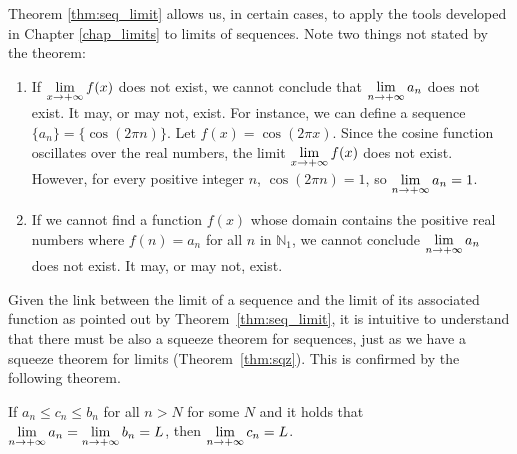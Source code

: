 Theorem \ref{thm:seq_limit} allows us, in certain cases, to apply the tools developed in Chapter \ref{chap_limits} to limits of sequences. Note two things not stated by the theorem:
	\begin{enumerate}
		\item If $\displaystyle \lim_{x\to+\infty}f(x)$ does not exist, we cannot conclude that $\displaystyle\lim_{n\to+\infty} a_n$ does not exist. It may, or may not, exist. For instance, we can define a sequence $\{a_n\} = \{\cos(2\pi n)\}$. Let $f(x) = \cos (2\pi x)$. Since the cosine function oscillates over the real numbers, the limit $\displaystyle \lim_{x\to+\infty}f(x)$ does not exist. However, for every positive integer $n$, $\cos(2\pi n) = 1$, so $\displaystyle \lim_{n\to+\infty} a_n = 1$.

		\item	If we cannot find a function $f(x)$ whose domain contains the positive real numbers where $f(n) = a_n$ for all $n$ in $\mathbb{N}_1$, we cannot conclude $\displaystyle\lim_{n\to+\infty} a_n$ does not exist. It may, or may not, exist.
	\end{enumerate}

\ifanalysis


Given the link between the limit of a sequence and the limit of its associated function as pointed out by Theorem~\ref{thm:seq_limit}, it is intuitive to understand that there must be also a squeeze theorem for sequences, just as we have a squeeze theorem for limits (Theorem~\ref{thm:sqz}). This is confirmed by the following theorem. 


\begin{theorem}
If $a_n\leq c_n\leq b_n$ for all $n>N$ for some $N$ and it holds that $\displaystyle\lim_{n\to+\infty}a_n=\displaystyle\lim_{n\to+\infty}b_n=L$, then $\displaystyle\lim_{n\to+\infty}c_n=L$.
\end{theorem}

\fi

